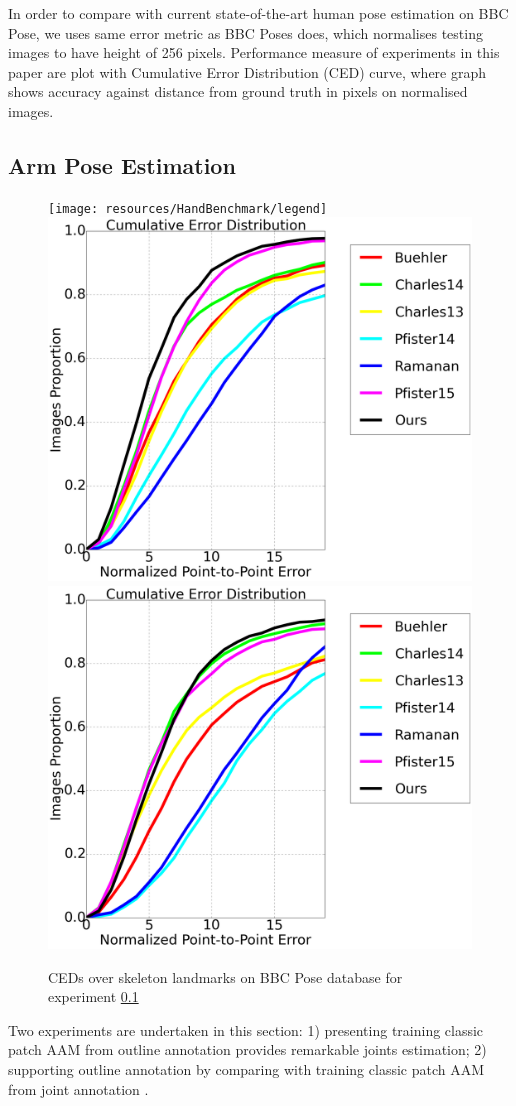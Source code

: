 In order to compare with current state-of-the-art human pose estimation on BBC Pose, we uses same error metric as BBC Poses does, which normalises testing images to have height of 256 pixels. Performance measure of experiments in this paper are plot with Cumulative Error Distribution (CED) curve, where graph shows accuracy against distance from ground truth in pixels on normalised images.

\subsection{Arm Pose Estimation}
\label{exp:benchmark}

\begin{figure}[b!]
    \centering
    \texttt{[image: resources/HandBenchmark/legend]}
    \\
    \includegraphics[width=0.48\columnwidth]{resources/HandBenchmark/wrist}
    \includegraphics[width=0.48\columnwidth]{resources/HandBenchmark/elbow}
    \caption{CEDs over skeleton landmarks on BBC Pose database for experiment \ref{exp:benchmark}}
    \label{fig:hand_benchmark}
\end{figure}

Two experiments are undertaken in this section: 1) presenting training classic patch AAM from outline annotation provides remarkable joints estimation; 2) supporting outline annotation by comparing with training classic patch AAM from joint annotation .

